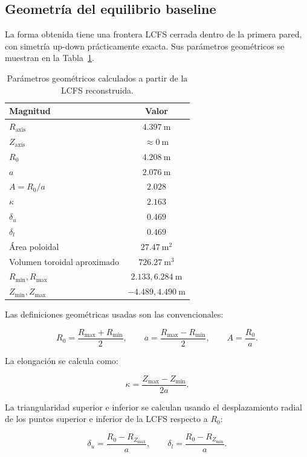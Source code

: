 \documentclass[11pt,a4paper]{article}
\begin{document}
\subsection{Geometría del equilibrio baseline}
La forma obtenida tiene una frontera LCFS cerrada dentro de la primera pared, con simetría
up-down prácticamente exacta. Sus parámetros geométricos se muestran en la Tabla~\ref{tab:baseline_geometry_detailed}.

\begin{table}[htbp]
\centering
\caption{Parámetros geométricos calculados a partir de la LCFS reconstruida.}
\label{tab:baseline_geometry_detailed}
\begin{tabular}{lc}
\toprule
\textbf{Magnitud} & \textbf{Valor} \\
\midrule
$R_{\mathrm{axis}}$ & $4.397~\mathrm{m}$ \\
$Z_{\mathrm{axis}}$ & $\approx 0~\mathrm{m}$ \\
$R_0$ & $4.208~\mathrm{m}$ \\
$a$ & $2.076~\mathrm{m}$ \\
$A=R_0/a$ & $2.028$ \\
$\kappa$ & $2.163$ \\
$\delta_u$ & $0.469$ \\
$\delta_l$ & $0.469$ \\
Área poloidal & $27.47~\mathrm{m^2}$ \\
Volumen toroidal aproximado & $726.27~\mathrm{m^3}$ \\
$R_{\min},R_{\max}$ & $2.133,6.284~\mathrm{m}$ \\
$Z_{\min},Z_{\max}$ & $-4.489,4.490~\mathrm{m}$ \\
\bottomrule
\end{tabular}
\end{table}

Las definiciones geométricas usadas son las convencionales:

\[
R_0 = \frac{R_{\max}+R_{\min}}{2}, \qquad
 a = \frac{R_{\max}-R_{\min}}{2}, \qquad
 A = \frac{R_0}{a}.
\]

La elongación se calcula como:

\[
\kappa = \frac{Z_{\max}-Z_{\min}}{2a}.
\]

La triangularidad superior e inferior se calculan usando el desplazamiento radial de los puntos
superior e inferior de la LCFS respecto a $R_0$:

\[
\delta_u = \frac{R_0 - R_{Z_{\max}}}{a},\qquad
\delta_l = \frac{R_0 - R_{Z_{\min}}}{a}.
\]
\end{document}
